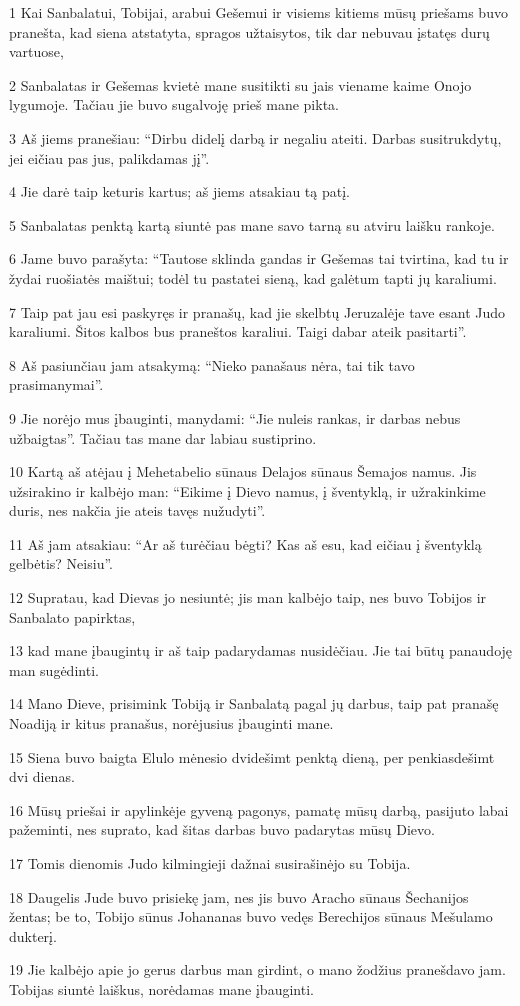 \par 1 Kai Sanbalatui, Tobijai, arabui Gešemui ir visiems kitiems mūsų priešams buvo pranešta, kad siena atstatyta, spragos užtaisytos, tik dar nebuvau įstatęs durų vartuose, 
\par 2 Sanbalatas ir Gešemas kvietė mane susitikti su jais viename kaime Onojo lygumoje. Tačiau jie buvo sugalvoję prieš mane pikta. 
\par 3 Aš jiems pranešiau: “Dirbu didelį darbą ir negaliu ateiti. Darbas susitrukdytų, jei eičiau pas jus, palikdamas jį”. 
\par 4 Jie darė taip keturis kartus; aš jiems atsakiau tą patį. 
\par 5 Sanbalatas penktą kartą siuntė pas mane savo tarną su atviru laišku rankoje. 
\par 6 Jame buvo parašyta: “Tautose sklinda gandas ir Gešemas tai tvirtina, kad tu ir žydai ruošiatės maištui; todėl tu pastatei sieną, kad galėtum tapti jų karaliumi. 
\par 7 Taip pat jau esi paskyręs ir pranašų, kad jie skelbtų Jeruzalėje tave esant Judo karaliumi. Šitos kalbos bus praneštos karaliui. Taigi dabar ateik pasitarti”. 
\par 8 Aš pasiunčiau jam atsakymą: “Nieko panašaus nėra, tai tik tavo prasimanymai”. 
\par 9 Jie norėjo mus įbauginti, manydami: “Jie nuleis rankas, ir darbas nebus užbaigtas”. Tačiau tas mane dar labiau sustiprino. 
\par 10 Kartą aš atėjau į Mehetabelio sūnaus Delajos sūnaus Šemajos namus. Jis užsirakino ir kalbėjo man: “Eikime į Dievo namus, į šventyklą, ir užrakinkime duris, nes nakčia jie ateis tavęs nužudyti”. 
\par 11 Aš jam atsakiau: “Ar aš turėčiau bėgti? Kas aš esu, kad eičiau į šventyklą gelbėtis? Neisiu”. 
\par 12 Supratau, kad Dievas jo nesiuntė; jis man kalbėjo taip, nes buvo Tobijos ir Sanbalato papirktas, 
\par 13 kad mane įbaugintų ir aš taip padarydamas nusidėčiau. Jie tai būtų panaudoję man sugėdinti. 
\par 14 Mano Dieve, prisimink Tobiją ir Sanbalatą pagal jų darbus, taip pat pranašę Noadiją ir kitus pranašus, norėjusius įbauginti mane. 
\par 15 Siena buvo baigta Elulo mėnesio dvidešimt penktą dieną, per penkiasdešimt dvi dienas. 
\par 16 Mūsų priešai ir apylinkėje gyveną pagonys, pamatę mūsų darbą, pasijuto labai pažeminti, nes suprato, kad šitas darbas buvo padarytas mūsų Dievo. 
\par 17 Tomis dienomis Judo kilmingieji dažnai susirašinėjo su Tobija. 
\par 18 Daugelis Jude buvo prisiekę jam, nes jis buvo Aracho sūnaus Šechanijos žentas; be to, Tobijo sūnus Johananas buvo vedęs Berechijos sūnaus Mešulamo dukterį. 
\par 19 Jie kalbėjo apie jo gerus darbus man girdint, o mano žodžius pranešdavo jam. Tobijas siuntė laiškus, norėdamas mane įbauginti.



